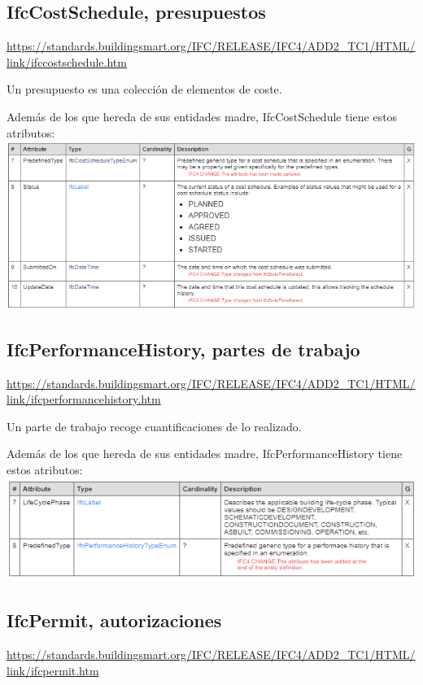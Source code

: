 \documentclass[spanish,12pt,a4paper,final,oneside]{book}
\begin{document}
\subsection{IfcCostSchedule, presupuestos}
\url{https://standards.buildingsmart.org/IFC/RELEASE/IFC4/ADD2_TC1/HTML/link/ifccostschedule.htm}

Un presupuesto es una colección de elementos de coste.

Además de los que hereda de sus entidades madre, IfcCostSchedule tiene estos atributos:
\\ \includegraphics[width=\textwidth]{atributos de IfcCostSchedule}


\subsection{IfcPerformanceHistory, partes de trabajo}
\url{https://standards.buildingsmart.org/IFC/RELEASE/IFC4/ADD2_TC1/HTML/link/ifcperformancehistory.htm}

Un parte de trabajo recoge cuantificaciones de lo realizado.

Además de los que hereda de sus entidades madre, IfcPerformanceHistory tiene estos atributos:
\\ \includegraphics[width=\textwidth]{atributos de IfcPerformanceHistory}


\subsection{IfcPermit, autorizaciones}
\url{https://standards.buildingsmart.org/IFC/RELEASE/IFC4/ADD2_TC1/HTML/link/ifcpermit.htm}
\end{document}
